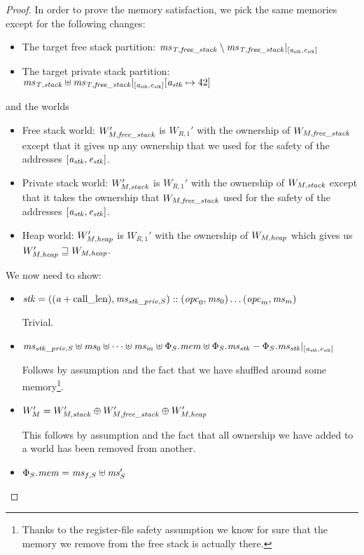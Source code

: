 \begin{proof}
  In order to prove the memory satisfaction, we pick the same memories except for the following changes:
  \begin{itemize}
  \item The target free stack partition: $\mathit{ms}_{\mathit{T,free\_stack}} \setminus \mathit{ms}_{\mathit{T,free\_stack}}|_{[\mathit{a}_{\mathit{stk}},\mathit{e}_{\mathit{stk}}]}$
  \item The target private stack partition: $\mathit{ms}_{\mathit{T,stack}} \uplus \mathit{ms}_{\mathit{T,free\_stack}}|_{[\mathit{a}_{\mathit{stk}},\mathit{e}_{\mathit{stk}}]}[\mathit{a}_{\mathit{stk}} \mapsto 42]$
  \end{itemize}
  and the worlds
  \begin{itemize}
  \item Free stack world: $W_{M,\mathit{free\_stack}}'$ is $W_{R,1}'$ with the ownership of $W_{M,\mathit{free\_stack}}$ except that it gives up any ownership that we used for the safety of the addresses $[\mathit{a}_{\mathit{stk}},\mathit{e}_{\mathit{stk}}]$.
  \item Private stack world: $W_{M,\mathit{stack}}'$ is $W_{R,1}'$ with the ownership of $W_{M,\mathit{stack}}$ except that it takes the ownership that $W_{M,\mathit{free\_stack}}$ used for the safety of the addresses $[\mathit{a}_{\mathit{stk}},\mathit{e}_{\mathit{stk}}]$.
  \item Heap world: $W_{M,\mathit{heap}}'$ is $W_{R,1}'$ with the ownership of $W_{M,\mathit{heap}}$ which gives us $W_{M,\mathit{heap}}' \sqsupseteq W_{M,\mathit{heap}}$.
  \end{itemize}
  We now need to show:
  \begin{itemize}
  \item $\mathit{stk} = ((\mathit{a}+\mathrm{call\_len}),\mathit{ms}_{\mathit{stk}\_\mathit{priv},S}) :: (\mathit{opc}_0, \mathit{ms}_0) \dots (\mathit{opc}_m,\mathit{ms}_m)$

    Trivial.
  \item $\mathit{ms}_{\mathit{stk}\_\mathit{priv},S} \uplus \mathit{ms}_0 \uplus \dots \uplus \mathit{ms}_m \uplus \Phi_S.\mathit{mem} \uplus \Phi_S.\mathit{ms}_{\mathit{stk}} - \Phi_S.\mathit{ms}_{\mathit{stk}}|_{[\mathit{a}_{\mathit{stk}},\mathit{e}_{\mathit{stk}}]}$

    Follows by assumption and the fact that we have shuffled around some memory\footnote{Thanks to the register-file safety assumption we know for sure that the memory we remove from the free stack is actually there.}.
  \item $W_M' = W_{M,\mathit{stack}}' \oplus W_{M,\mathit{free\_stack}}' \oplus W_{M,\mathit{heap}}'$

    This follows by assumption and the fact that all ownership we have added to a world has been removed from another.
  \item $\Phi_S.\mathit{mem} = \mathit{ms}_{f,S} \uplus \mathit{ms}_S'$


\end{itemize}
\end{proof}
